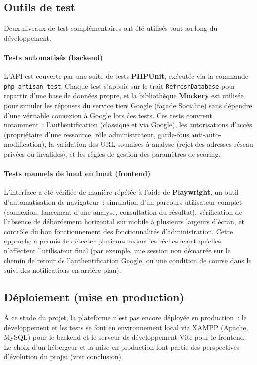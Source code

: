 \subsection{Outils de test}

Deux niveaux de test compl\'ementaires ont \'et\'e utilis\'es tout au long du
d\'eveloppement.

\paragraph{Tests automatis\'es (backend)} L'API est couverte par une suite de
tests \textbf{PHPUnit}, ex\'ecut\'ee via la commande \texttt{php artisan test}.
Chaque test s'appuie sur le trait \texttt{RefreshDatabase} pour repartir d'une
base de donn\'ees propre, et la biblioth\`eque \textbf{Mockery} est utilis\'ee
pour simuler les r\'eponses du service tiers Google (fa\c{c}ade Socialite) sans
d\'ependre d'une v\'eritable connexion \`a Google lors des tests. Ces tests
couvrent notamment~: l'authentification (classique et via Google), les
autorisations d'acc\`es (propri\'etaire d'une ressource, r\^ole administrateur,
garde-fous anti-auto-modification), la validation des URL soumises \`a
analyse (rejet des adresses r\'eseau priv\'ees ou invalides), et les r\`egles de
gestion des param\`etres de scoring.

\paragraph{Tests manuels de bout en bout (frontend)} L'interface a \'et\'e
v\'erifi\'ee de mani\`ere r\'ep\'et\'ee \`a l'aide de \textbf{Playwright}, un outil
d'automatisation de navigateur~: simulation d'un parcours utilisateur complet
(connexion, lancement d'une analyse, consultation du r\'esultat), v\'erification
de l'absence de d\'ebordement horizontal sur mobile \`a plusieurs largeurs
d'\'ecran, et contr\^ole du bon fonctionnement des fonctionnalit\'es
d'administration. Cette approche a permis de d\'etecter plusieurs anomalies
r\'eelles avant qu'elles n'affectent l'utilisateur final (par exemple, une
session non d\'emarr\'ee sur le chemin de retour de l'authentification Google, ou
une condition de course dans le suivi des notifications en arri\`ere-plan).

\subsection{D\'eploiement (mise en production)}

\`A ce stade du projet, la plateforme n'est pas encore d\'eploy\'ee en production~:
le d\'eveloppement et les tests se font en environnement local via XAMPP
(Apache, MySQL) pour le backend et le serveur de d\'eveloppement Vite pour le
frontend. Le choix d'un h\'ebergeur et la mise en production font partie des
perspectives d'\'evolution du projet (voir conclusion).

